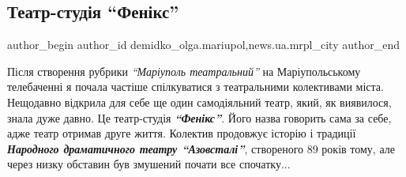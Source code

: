 
 
 
 
 
 
\subsection{Театр-студія \enquote{Фенікс}}
\label{sec:25_08_2020.stz.news.ua.mrpl_city.1.teatr_studia_feniks}
 
\ifcmt
 author_begin
   author_id demidko_olga.mariupol,news.ua.mrpl_city
 author_end
\fi

Після створення рубрики \emph{\enquote{Маріуполь театральний}} на Маріупольському телебаченні
я почала частіше спілкуватися з театральними колективами міста. Нещодавно
відкрила для себе ще один самодіяльний театр, який, як виявилося, знала дуже
давно. Це театр-студія \emph{\textbf{\enquote{Фенікс}}}. Його назва говорить сама за себе, адже театр
отримав друге життя. Колектив продовжує історію і традиції \emph{\textbf{Народного
драматичного театру \enquote{Азовсталі}}}, створеного 89 років тому, але через низку
обставин був змушений почати все спочатку...


